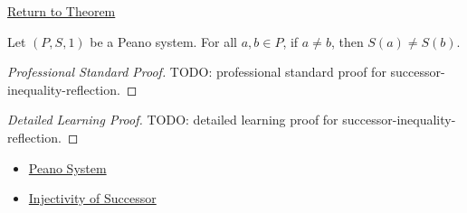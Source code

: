\newpage
{}
\label{prf:successor-inequality-reflection}

\begin{remark*}[Return]
\hyperref[thm:successor-inequality-reflection]{Return to Theorem}
\end{remark*}

\begin{theorem*}
Let $(P,S,1)$ be a Peano system. For all $a,b \in P$, if $a \neq b$, then
$S(a)\neq S(b)$.
\end{theorem*}

\begin{proof}[Professional Standard Proof]
\LRAProofBodyStart
TODO: professional standard proof for successor-inequality-reflection.
\end{proof}

\begin{proof}[Detailed Learning Proof]
\LRAProofBodyStart
TODO: detailed learning proof for successor-inequality-reflection.
\end{proof}

\begin{remark*}
\end{remark*}

\begin{dependencies}
\begin{itemize}
  \item \hyperref[def:peano-system]{Peano System}
  \item \hyperref[ax:peano-successor-injective]{Injectivity of Successor}
\end{itemize}
\end{dependencies}

\clearpage
